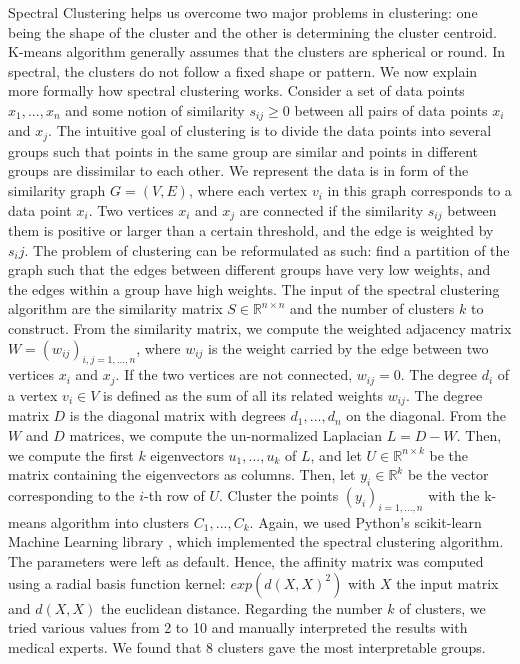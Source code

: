 Spectral Clustering \cite{luxburg_tutorial_2007} helps us overcome two major
problems in clustering: one being the shape of the cluster and the other is
determining the cluster centroid. K-means algorithm generally assumes that the
clusters are spherical or round. In spectral, the clusters do not follow a fixed
shape or pattern. We now explain more formally how spectral clustering works.
Consider a set of data points $x_1, ..., x_n$ and some notion of similarity
$s_{ij} \geq 0$ between all pairs of data points $x_i$ and $x_j$. The intuitive
goal of clustering is to divide the data points into several groups such that
points in the same group are similar and points in different groups are
dissimilar to each other. We represent the data is in form of the similarity
graph $G = (V, E)$, where each vertex $v_i$ in this graph corresponds to a data
point $x_i$. Two vertices $x_i$ and $x_j$ are connected if the similarity
$s_{ij}$ between them is positive or larger than a certain threshold, and the
edge is weighted by $s_ij$. The problem of clustering can be reformulated as
such: find a partition of the graph such that the edges between different groups
have very low weights, and the edges within a group have high weights. The input
of the spectral clustering algorithm are the similarity matrix $S \in
    \mathbb{R}^{n \times n}$ and the number of clusters $k$ to construct. From the
similarity matrix, we compute the weighted adjacency matrix $W =
    (w_{ij})_{i,j=1, ..., n}$, where $w_{ij}$ is the weight carried by the edge
between two vertices $x_i$ and $x_j$. If the two vertices are not connected,
$w_{ij}=0$. The degree $d_i$ of a vertex $v_i \in V$ is defined as the sum of
all its related weights $w_{ij}$. The degree matrix $D$ is the diagonal matrix
with degrees $d_1, ..., d_n$ on the diagonal. From the $W$ and $D$ matrices, we
compute the un-normalized Laplacian $L=D-W$. Then, we compute the first $k$
eigenvectors $u_1, ..., u_k$ of $L$, and let $U \in \mathbb{R}^{n \times k}$ be
the matrix containing the eigenvectors as columns. Then, let $y_i \in
    \mathbb{R}^k$ be the vector corresponding to the $i$-th row of $U$. Cluster the
points $(y_i)_{i=1,...,n}$ with the k-means algorithm into clusters $C_1, ...,
    C_k$. Again, we used Python's scikit-learn Machine Learning library
\cite{pedregosa_scikit-learn_2011}, which implemented the spectral clustering
algorithm. The parameters were left as default. Hence, the affinity matrix was
computed using a radial basis function kernel: $exp(d(X, X)^2)$ with $X$ the
input matrix and $d(X, X)$ the euclidean distance. Regarding the number $k$ of
clusters, we tried various values from 2 to 10 and manually interpreted the
results with medical experts. We found that 8 clusters gave the most
interpretable groups.

